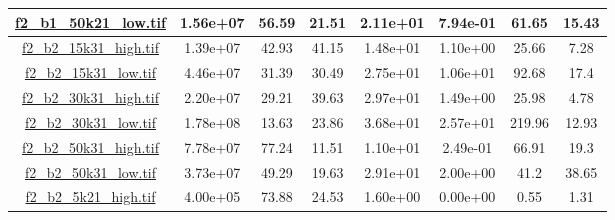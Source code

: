 \begin{table}[h]
\begin{adjustwidth}{-1cm}{}
\begin{tabular}{ |c |c |c |c |c |c |c |c |}
{\hyperlink{histf2_b1_50k21_low}{\color{blue}f2\_b1\_50k21\_low.tif}} & 1.56e+07 & 56.59 & 21.51 & 2.11e+01 & 7.94e-01 & 61.65 & 15.43\\ \hline
{\hyperlink{histf2_b2_15k31_high}{\color{blue}f2\_b2\_15k31\_high.tif}} & 1.39e+07 & 42.93 & 41.15 & 1.48e+01 & 1.10e+00 & 25.66 & 7.28\\ \hline
{\hyperlink{histf2_b2_15k31_low}{\color{blue}f2\_b2\_15k31\_low.tif}} & 4.46e+07 & 31.39 & 30.49 & 2.75e+01 & 1.06e+01 & 92.68 & 17.4\\ \hline
{\hyperlink{histf2_b2_30k31_high}{\color{blue}f2\_b2\_30k31\_high.tif}} & 2.20e+07 & 29.21 & 39.63 & 2.97e+01 & 1.49e+00 & 25.98 & 4.78\\ \hline
{\hyperlink{histf2_b2_30k31_low}{\color{blue}f2\_b2\_30k31\_low.tif}} & 1.78e+08 & 13.63 & 23.86 & 3.68e+01 & 2.57e+01 & 219.96 & 12.93\\ \hline
{\hyperlink{histf2_b2_50k31_high}{\color{blue}f2\_b2\_50k31\_high.tif}} & 7.78e+07 & 77.24 & 11.51 & 1.10e+01 & 2.49e-01 & 66.91 & 19.3\\ \hline
{\hyperlink{histf2_b2_50k31_low}{\color{blue}f2\_b2\_50k31\_low.tif}} & 3.73e+07 & 49.29 & 19.63 & 2.91e+01 & 2.00e+00 & 41.2 & 38.65\\ \hline
{\hyperlink{histf2_b2_5k21_high}{\color{blue}f2\_b2\_5k21\_high.tif}} & 4.00e+05 & 73.88 & 24.53 & 1.60e+00 & 0.00e+00 & 0.55 & 1.31\\ \hline
\end{tabular}
\end{adjustwidth}
\end{table}

